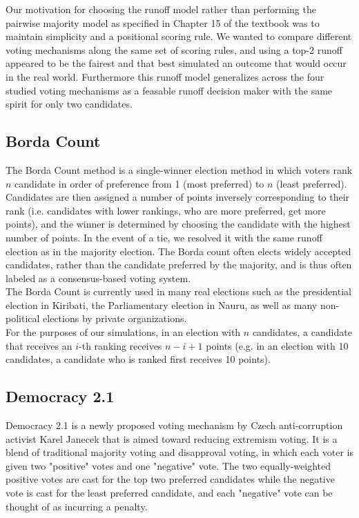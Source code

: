 \documentclass[11pt]{scrartcl}
\begin{document}
Our motivation for choosing the runoff model rather than performing the pairwise majority model as specified in Chapter 15 of the textbook was to maintain simplicity and a positional scoring rule. We wanted to compare different voting mechanisms along the same set of scoring rules, and using a top-2 runoff appeared to be the fairest and that best simulated an outcome that would occur in the real world. Furthermore this runoff model generalizes across the four studied voting mechanisms as a feasable runoff decision maker with the same spirit for only two candidates.

\subsection{Borda Count}

The Borda Count method is a single-winner election method in which voters rank $n$ candidate in order of preference from 1 (most preferred) to $n$ (least preferred). Candidates are then assigned a number of points inversely corresponding to their rank (i.e. candidates with lower rankings, who are more preferred, get more points), and the winner is determined by choosing the candidate with the highest number of points. In the event of a tie, we resolved it with the same runoff election as in the majority election. The Borda count often elects widely accepted candidates, rather than the candidate preferred by the majority, and is thus often labeled as a consensus-based voting system.\\

The Borda Count is currently used in many real elections such as the presidential election in Kiribati, the Parliamentary election in Nauru, as well as many non-political elections by private organizations. \\

For the purposes of our simulations, in an election with $n$ candidates, a candidate that receives an $i$-th ranking receives $n-i+ 1$ points (e.g. in an election with 10 candidates, a candidate who is ranked first receives 10 points). 

\subsection{Democracy 2.1} 

Democracy 2.1 is a newly proposed voting mechanism by Czech anti-corruption activist Karel Janecek that is aimed toward reducing extremism voting. It is a blend of traditional majority voting and disapproval voting, in which each voter is given two "positive" votes and one "negative" vote. The two equally-weighted positive votes are cast for the top two preferred candidates while the negative vote is cast for the least preferred candidate, and each "negative" vote can be thought of as incurring a penalty.
\end{document}
